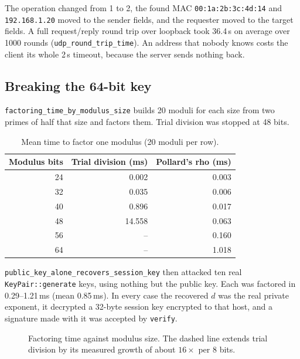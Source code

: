 \documentclass[11pt,a4paper]{article}
\begin{document}
The operation changed from 1 to 2, the found MAC \texttt{00:1a:2b:3c:4d:14}
and \texttt{192.168.1.20} moved to the sender fields, and the requester moved to
the target fields. A full request/reply round trip over loopback took
36.4\,\textmu s on average over 1000 rounds (\texttt{udp\_round\_trip\_time}).
An address that nobody knows costs the client its whole 2\,s timeout, because
the server sends nothing back.

\subsection{Breaking the 64-bit key}

\texttt{factoring\_time\_by\_modulus\_size} builds 20 moduli for each size from
two primes of half that size and factors them. Trial division was stopped at
48 bits.

\begin{table}[H]
\centering
\small
\begin{tabular}{@{}r r r@{}}
\toprule
Modulus bits & Trial division (ms) & Pollard's rho (ms) \\
\midrule
24 & 0.002  & 0.003 \\
32 & 0.035  & 0.006 \\
40 & 0.896  & 0.017 \\
48 & 14.558 & 0.063 \\
56 & --     & 0.160 \\
64 & --     & 1.018 \\
\bottomrule
\end{tabular}
\caption{Mean time to factor one modulus (20 moduli per row).}
\label{tab:factor}
\end{table}

\texttt{public\_key\_alone\_recovers\_session\_key} then attacked ten real
\texttt{KeyPair::generate} keys, using nothing but the public key. Each was
factored in 0.29--1.21\,ms (mean 0.85\,ms). In every case the recovered $d$ was
the real private exponent, it decrypted a 32-byte session key encrypted to that
host, and a signature made with it was accepted by \texttt{verify}.

\begin{figure}[H]
\centering
{}
\caption{Factoring time against modulus size. The dashed line extends trial division by its measured growth of about $16\times$ per 8 bits.}
\label{fig:factor}
\end{figure}
\end{document}
